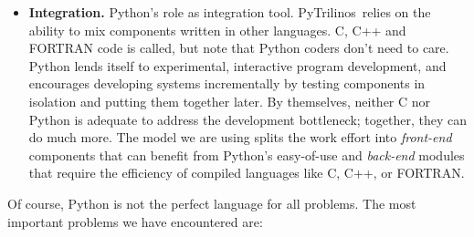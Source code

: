 \documentclass[10pt,relax]{SANDreport}
\newcommand{\PyTrilinos}{{PyTrilinos}}
\begin{document}
\begin{itemize}
\item {\bf Integration.} Python's role as integration
  tool. \PyTrilinos\ relies on the ability to mix components written
  in other languages. C, C++ and FORTRAN code is called, but note that
  Python coders don't need to care.  Python lends itself to
  experimental, interactive program development, and encourages
  developing systems incrementally by testing components in isolation
  and putting them together later.  By themselves, neither C nor
  Python is adequate to address the development bottleneck; together,
  they can do much more.  The model we are using splits the work
  effort into {\sl front-end} components that can benefit from
  Python's easy-of-use and {\sl back-end} modules that require the
  efficiency of compiled languages like C, C++, or FORTRAN.

\end{itemize}

\smallskip

Of course, Python is not the perfect language for all problems. The
most important problems we have encountered are:
\end{document}
